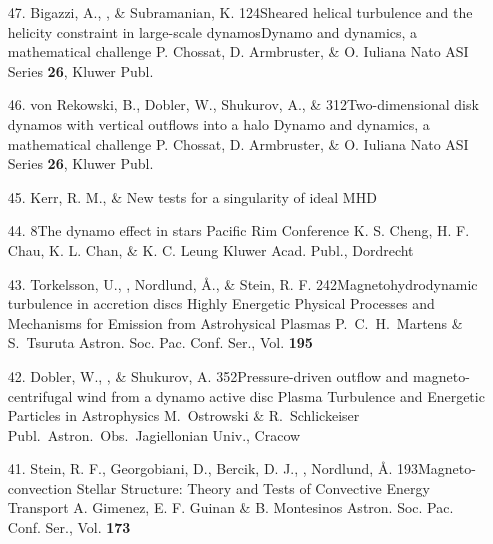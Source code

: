 \begin{itemize}
\item[47.]
Bigazzi, A., \Brandenburg, \& Subramanian, K.
{124}{Sheared helical turbulence and the helicity constraint in
large-scale dynamos}{Dynamo and dynamics, a mathematical challenge}
{P. Chossat, D. Armbruster, \& O. Iuliana}
{Nato ASI Series {\bf 26}, Kluwer Publ.}

\item[46.]
von Rekowski, B., Dobler, W., Shukurov, A., \& \Brandenburg{}
{312}{Two-dimensional disk dynamos with vertical outflows into a halo}
{Dynamo and dynamics, a mathematical challenge}
{P. Chossat, D. Armbruster, \& O. Iuliana}
{Nato ASI Series {\bf 26}, Kluwer Publ.}

\item[45.]
Kerr, R. M., \& \Brandenburg{}
{New tests for a singularity of ideal MHD}

\item[44.]
\Brandenburg{}
{8}{The dynamo effect in stars}
{Pacific Rim Conference}
{K. S. Cheng, H. F. Chau, K. L. Chan, \& K. C. Leung}
{Kluwer Acad. Publ., Dordrecht}

\item[43.]
Torkelsson, U., \Brandenburg, Nordlund, \AA., \&
Stein, R. F.
{242}{Magnetohydrodynamic turbulence in accretion discs}
{Highly Energetic Physical Processes and Mechanisms for Emission
from Astrohysical Plasmas}
{P.\ C.\ H.\ Martens \& S.\ Tsuruta}
{Astron. Soc. Pac. Conf. Ser., Vol. {\bf 195}}

\item[42.]
Dobler, W., \Brandenburg, \& Shukurov, A.
{352}{Pressure-driven outflow and magneto-centrifugal wind from a
dynamo active disc}
{Plasma Turbulence and Energetic Particles in Astrophysics}
{M.\ Ostrowski \& R.\ Schlickeiser}
{Publ.\ Astron.\ Obs.\ Jagiellonian Univ., Cracow}
 
\item[41.]
Stein, R. F., Georgobiani, D., Bercik, D. J., \Brandenburg,
Nordlund, \AA.
{193}{Magneto-convection}
{Stellar Structure: Theory and Tests of Convective Energy Transport}
{A. Gimenez, E. F. Guinan \& B. Montesinos}
{Astron. Soc. Pac. Conf. Ser., Vol. {\bf 173}}


\end{itemize}
